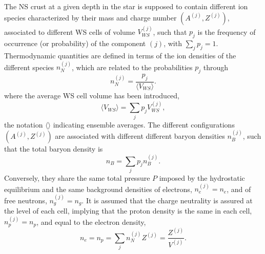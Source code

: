 The NS crust at a given depth in the star is supposed to contain different ion
species characterized by their mass and charge number $(A^{(j)},Z^{(j)})$, 
associated to different WS cells of volume $V_{WS}^{(j)}$, such that $p_j$ is 
the frequency of occurrence (or probability) of the component $(j)$, with 
$\sum_j p_j = 1$.
Thermodynamic quantities are defined in terms of the ion densities of the 
different species $n_N^{(j)}$, which are related to the probabilities $p_j$ 
through 
%
\begin{equation}
  n_N^{(j)}=\frac{p_j}{\langle V_{WS}\rangle}.\label{eq:nnj}
\end{equation}
%
where the average WS cell volume has been introduced,
%
\begin{equation}
  \langle V_{WS} \rangle = \sum_j p_j V_{WS}^{(j)},
\end{equation}
%
the notation $\langle\rangle$ indicating ensemble averages.
The different configurations $(A^{(j)},Z^{(j)})$ are associated with different
different baryon densities $n_B^{(j)}$, such that the total baryon density is
%
\begin{equation}
  n_B = \sum_j p_j n_B^{(j)}.
\end{equation}
%
Conversely, they share the same total pressure $P$ imposed by the hydrostatic 
equilibrium and the same background densities of electrons, $n_e^{(j)}=n_e$, 
and of free neutrons, $n_g^{(j)}=n_g$.
It is assumed that the charge neutrality is assured at the level of each cell,
implying that the proton density is the same in each cell, $n_p^{(j)}=n_p$, and
equal to the electron density, 
%
\begin{equation}
  n_e = n_p = \sum_j n_N^{(j)} Z^{(j)} =
  \frac{Z^{(j)}}{V^{(j)}}.\label{eq:chargeneut}
\end{equation}

